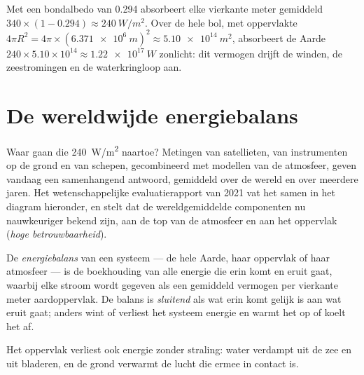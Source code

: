 \begin{example}\label{ex:g10:earth-energy-budget:absorbed}
Met een bondalbedo van 0.294 absorbeert elke vierkante meter gemiddeld $340
\times (1 - 0.294) \approx \qty{240}{W/m^2}$. Over de hele bol, met oppervlakte
$4\pi R^2 = 4\pi \times (\qty{6.371e6}{m})^2 \approx \qty{5.10e14}{m^2}$,
absorbeert de Aarde $240 \times 5.10\times10^{14} \approx \qty{1.22e17}{W}$
zonlicht: dit vermogen drijft de winden, de zeestromingen en de waterkringloop
aan.
\end{example}

\section{De wereldwijde energiebalans}

Waar gaan die \qty{240}{W/m^2} naartoe? Metingen van satellieten, van
instrumenten op de grond en van schepen, gecombineerd met modellen van de
atmosfeer, geven vandaag een samenhangend antwoord, gemiddeld over de wereld en
over meerdere jaren. Het wetenschappelijke evaluatierapport van 2021 vat het
samen in het diagram hieronder, en stelt dat de wereldgemiddelde componenten
nu nauwkeuriger bekend zijn, aan de top van de atmosfeer en aan het oppervlak
(\emph{hoge betrouwbaarheid}).

\begin{definition}[Energiebalans]\label{def:g10:earth-energy-budget:energy-budget}
De \emph{energiebalans} van een systeem --- de hele Aarde,
haar oppervlak of haar atmosfeer --- is de boekhouding van alle energie die
erin komt en eruit gaat, waarbij elke stroom wordt gegeven als een gemiddeld
vermogen per vierkante meter aardoppervlak. De balans is \emph{sluitend} als wat
erin komt gelijk is aan wat eruit gaat; anders wint of verliest het systeem
energie en warmt het op of koelt het af.
\end{definition}

Het oppervlak verliest ook energie zonder straling: water verdampt uit de zee en
uit bladeren, en de grond verwarmt de lucht die ermee in contact is.

